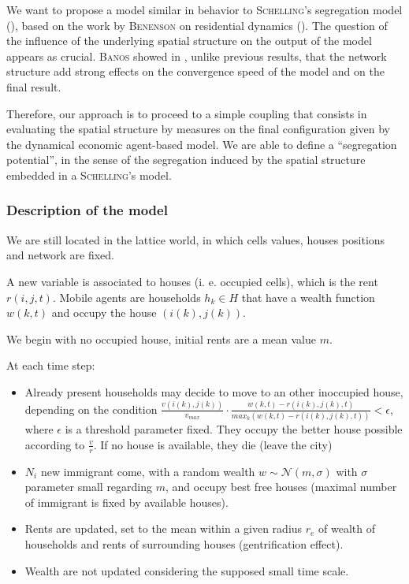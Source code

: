 \documentclass[a4paper,twocolumn,twoside,10pt]{article}
\newcommand{\noun}[1]{\textsc{#1}}
\begin{document}
We want to propose a model similar in behavior to \noun{Schelling}'s
segregation model (\cite{schelling1969models}), based on the work
by \noun{Benenson} on residential dynamics (\cite{benenson1998multi}).
The question of the influence of the underlying spatial structure
on the output of the model appears as crucial. \noun{Banos} showed
in \cite{banos2012network}, unlike previous results, that the network
structure add strong effects on the convergence speed of the model
and on the final result.

Therefore, our approach is to proceed to a simple coupling that consists
in evaluating the spatial structure by measures on the final configuration
given by the dynamical economic agent-based model. We are able to
define a ``segregation potential'', in the sense of the segregation
induced by the spatial structure embedded in a \noun{Schelling}'s model.


\subsubsection*{Description of the model}

We are still located in the lattice world, in which cells values,
houses positions and network are fixed.

A new variable is associated to houses (i. e. occupied cells), which
is the rent $r(i,j,t)$. Mobile agents are households $h_{k}\in H$
that have a wealth function $w(k,t)$ and occupy the house $(i(k),j(k))$.

We begin with no occupied house, initial rents are a mean value $m$.

At each time step:
\begin{itemize}
\item Already present households may decide to move to an other inoccupied
house, depending on the condition $\frac{v(i(k),j(k))}{v_{max}}\cdot\frac{w(k,t)-r(i(k),j(k),t)}{max_{k}(w(k,t)-r(i(k),j(k),t))}<\epsilon$,
where $\epsilon$ is a threshold parameter fixed. They occupy the better
house possible according to $\frac{v}{r}$. If no house is available,
they die (leave the city)
\item $N_{i}$ new immigrant come, with a random wealth $w\sim\mathcal{N}(m,\sigma)$
with $\sigma$ parameter small regarding $m$, and occupy best free
houses (maximal number of immigrant is fixed by available houses).
\item Rents are updated, set to the mean within a given radius $r_{e}$
of wealth of households and rents of surrounding houses (gentrification
effect).
\item Wealth are not updated considering the supposed small time scale.
\end{itemize}
\end{document}
